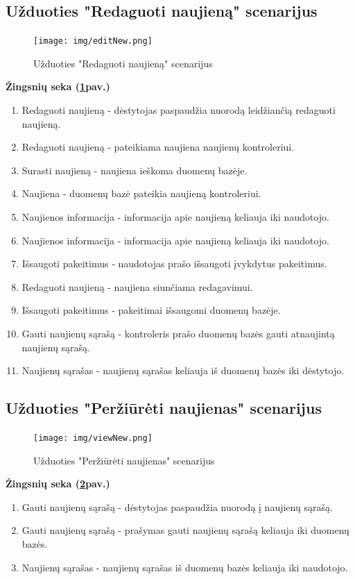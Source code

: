 \documentclass{VUMIFPSkursinis}
\begin{document}
\subsection{Užduoties "Redaguoti naujieną" scenarijus}
\begin{figure}[H]
	\centering
	\texttt{[image: img/editNew.png]}
	\caption{Užduoties "Redaguoti naujieną" scenarijus}
	\label{fig:edNew}
\end{figure}
\textbf{Žingsnių seka (\ref{fig:edNew}pav.)}\\
\begin{enumerate}
	\item Redaguoti naujieną - dėstytojas paspaudžia nuorodą leidžiančią redaguoti naujieną.
	\item Redaguoti naujieną - pateikiama naujiena naujienų kontroleriui.
	\item Surasti naujieną - naujiena ieškoma duomenų bazėje.
	\item Naujiena - duomenų bazė pateikia naujieną kontroleriui.
	\item Naujienos informacija -  informacija apie naujieną keliauja iki naudotojo.
	\item Naujienos informacija - informacija apie naujieną keliauja iki naudotojo.
	\item Išsaugoti pakeitimus - naudotojas prašo išsaugoti įvykdytus pakeitimus.
	\item Redaguoti naujieną - naujiena siunčiama redagavimui.
	\item Išsaugoti pakeitimus - pakeitimai išsaugomi duomenų bazėje.
	\item Gauti naujienų sąrašą - kontroleris prašo duomenų bazės gauti atnaujintą naujienų sąrašą.
	\item Naujienų sąrašas - naujienų sąrašas keliauja iš duomenų bazės iki dėstytojo.
\end{enumerate}
\subsection{Užduoties "Peržiūrėti naujienas" scenarijus}
\begin{figure}[H]
	\centering
	\texttt{[image: img/viewNew.png]}
	\caption{Užduoties "Peržiūrėti naujienas" scenarijus}
	\label{fig:viewNew}
\end{figure}
\textbf{Žingsnių seka (\ref{fig:viewNew}pav.)}\\
\begin{enumerate}
	\item Gauti naujienų sąrašą - dėstytojas paspaudžia nuorodą į naujienų sąrašą.
	\item Gauti naujienų sąrašą - prašymas gauti naujienų sąrašą keliauja iki duomenų bazės.
	\item Naujienų sąrašas - naujienų sąrašas iš duomenų bazės keliauja iki naudotojo.
\end{enumerate}
\end{document}
